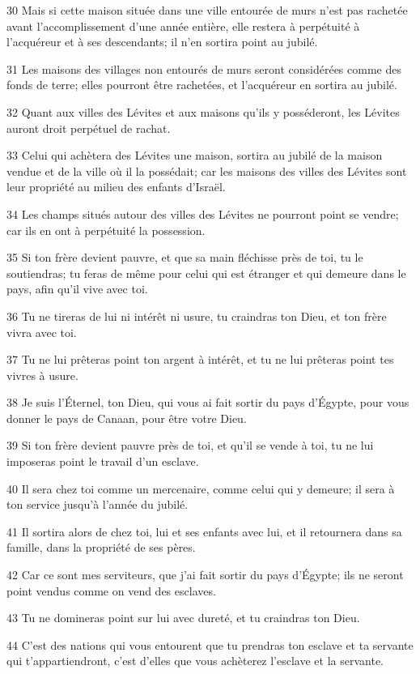 \par 30 Mais si cette maison située dans une ville entourée de murs n'est pas rachetée avant l'accomplissement d'une année entière, elle restera à perpétuité à l'acquéreur et à ses descendants; il n'en sortira point au jubilé.
\par 31 Les maisons des villages non entourés de murs seront considérées comme des fonds de terre; elles pourront être rachetées, et l'acquéreur en sortira au jubilé.
\par 32 Quant aux villes des Lévites et aux maisons qu'ils y posséderont, les Lévites auront droit perpétuel de rachat.
\par 33 Celui qui achètera des Lévites une maison, sortira au jubilé de la maison vendue et de la ville où il la possédait; car les maisons des villes des Lévites sont leur propriété au milieu des enfants d'Israël.
\par 34 Les champs situés autour des villes des Lévites ne pourront point se vendre; car ils en ont à perpétuité la possession.
\par 35 Si ton frère devient pauvre, et que sa main fléchisse près de toi, tu le soutiendras; tu feras de même pour celui qui est étranger et qui demeure dans le pays, afin qu'il vive avec toi.
\par 36 Tu ne tireras de lui ni intérêt ni usure, tu craindras ton Dieu, et ton frère vivra avec toi.
\par 37 Tu ne lui prêteras point ton argent à intérêt, et tu ne lui prêteras point tes vivres à usure.
\par 38 Je suis l'Éternel, ton Dieu, qui vous ai fait sortir du pays d'Égypte, pour vous donner le pays de Canaan, pour être votre Dieu.
\par 39 Si ton frère devient pauvre près de toi, et qu'il se vende à toi, tu ne lui imposeras point le travail d'un esclave.
\par 40 Il sera chez toi comme un mercenaire, comme celui qui y demeure; il sera à ton service jusqu'à l'année du jubilé.
\par 41 Il sortira alors de chez toi, lui et ses enfants avec lui, et il retournera dans sa famille, dans la propriété de ses pères.
\par 42 Car ce sont mes serviteurs, que j'ai fait sortir du pays d'Égypte; ils ne seront point vendus comme on vend des esclaves.
\par 43 Tu ne domineras point sur lui avec dureté, et tu craindras ton Dieu.
\par 44 C'est des nations qui vous entourent que tu prendras ton esclave et ta servante qui t'appartiendront, c'est d'elles que vous achèterez l'esclave et la servante.
